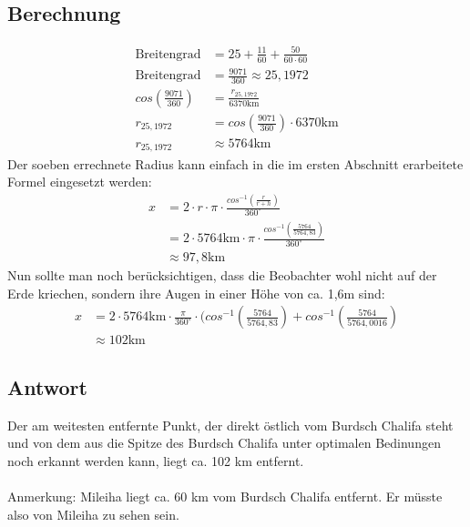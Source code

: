 \documentclass[a4paper,9pt]{scrartcl}
\begin{document}
    \subsection{Berechnung}
        \begin{align}
            \text{Breitengrad} &= 25 + \frac{11}{60} + \frac{50}{60 \cdot 60} \\
            \text{Breitengrad} &= \frac{9071}{360} \approx 25,1972 \\
            cos(\frac{9071}{360}) &= \frac{r_{25,1972}}{6370\text{km}} \\
            r_{25,1972} &= cos(\frac{9071}{360}) \cdot 6370\text{km} \\
            r_{25,1972} &\approx 5764\text{km}
        \end{align}
        Der soeben errechnete Radius kann einfach in die im ersten Abschnitt
        erarbeitete Formel eingesetzt werden:
    \begin{align}
        x &= 2 \cdot r \cdot \pi \cdot \frac{cos^{-1}(\frac{r}{r+h})}{360^\circ} \\
          &= 2 \cdot 5764 \text{km} \cdot \pi \cdot \frac{cos^{-1}(\frac{5764}{5764,83})}{360^\circ} \\
          &\approx 97,8 \text{km}
    \end{align}
        Nun sollte man noch berücksichtigen, dass die Beobachter wohl nicht auf
        der Erde kriechen, sondern ihre Augen in einer Höhe von ca. 1,6m sind:
    \begin{align}
        x &= 2 \cdot 5764 \text{km} \cdot \frac{\pi}{360^\circ} \cdot ( cos^{-1}(\frac{5764}{5764,83}) + cos^{-1}(\frac{5764}{5764,0016}) \\
          &\approx 102 \text{km}
    \end{align}

    \subsection{Antwort}
        Der am weitesten entfernte Punkt, der direkt östlich vom Burdsch Chalifa
        steht und von dem aus die Spitze des Burdsch Chalifa unter optimalen
        Bedinungen noch erkannt werden kann, liegt ca. 102 km entfernt. \\
        \\
        Anmerkung: Mileiha liegt ca. 60 km vom Burdsch Chalifa entfernt. Er 
        müsste also von Mileiha zu sehen sein.
\end{document}
